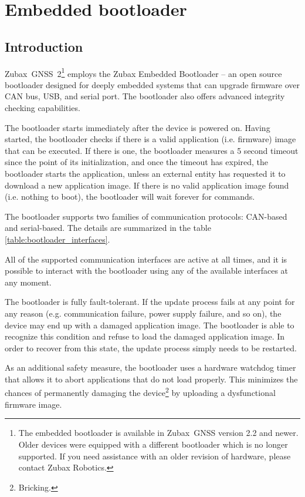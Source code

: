 \documentclass{zubaxdoc}
\begin{document}
\chapter{Embedded bootloader}\label{sec:bootloader}

\section{Introduction}

Zubax~GNSS~2\footnote{The embedded bootloader is available in Zubax~GNSS version 2.2 and newer.
Older devices were equipped with a different bootloader which is no longer supported.
If you need assistance with an older revision of hardware, please contact Zubax Robotics.}
employs the Zubax Embedded Bootloader --
an open source bootloader designed for deeply embedded systems
that can upgrade firmware over CAN bus, USB, and serial port.
The bootloader also offers advanced integrity checking capabilities.

The bootloader starts immediately after the device is powered on.
Having started, the bootloader checks if there is a valid application (i.e. firmware) image that can be executed.
If there is one, the bootloader measures a 5 second timeout since the point of its initialization,
and once the timeout has expired, the bootloader starts the application,
unless an external entity has requested it to download a new application image.
If there is no valid application image found (i.e. nothing to boot),
the bootloader will wait forever for commands.

The bootloader supports two families of communication protocols: CAN-based and serial-based.
The details are summarized in the table \ref{table:bootloader_interfaces}.

All of the supported communication interfaces are active at all times,
and it is possible to interact with the bootloader using any of the available interfaces
at any moment.

The bootloader is fully fault-tolerant.
If the update process fails at any point for any reason
(e.g. communication failure, power supply failure, and so on),
the device may end up with a damaged application image.
The bootloader is able to recognize this condition and refuse to load the damaged application image.
In order to recover from this state, the update process simply needs to be restarted.

As an additional safety measure, the bootloader uses a hardware watchdog timer that
allows it to abort applications that do not load properly.
This minimizes the chances of permanently damaging the device\footnote{Bricking.}
by uploading a dysfunctional firmware image.
\end{document}
